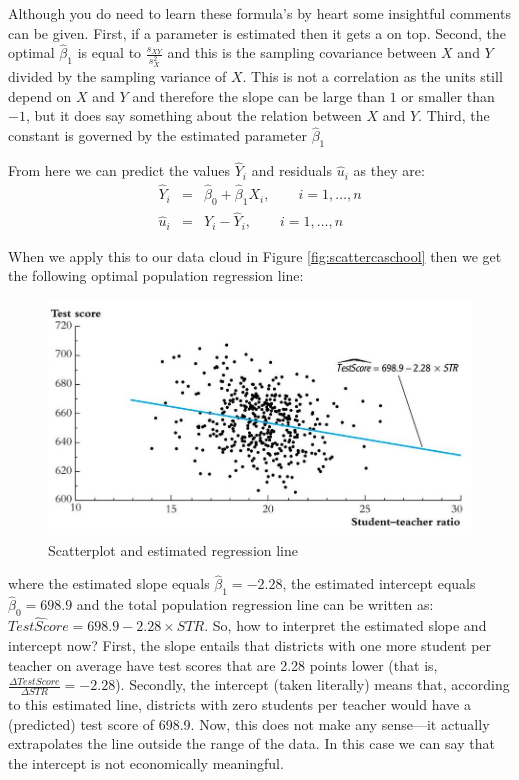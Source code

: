 \documentclass[
]{book}
\begin{document}
Although you do need to learn these formula's by heart some insightful comments can be given. First, if a parameter is estimated then it gets a on top. Second, the optimal \(\hat{\beta}_1\) is equal to \(\frac{s_{XY}}{s^2_X}\) and this is the sampling covariance between \(X\) and \(Y\) divided by the sampling variance of \(X\). This is not a correlation as the units still depend on \(X\) and \(Y\) and therefore the slope can be large than \(1\) or smaller than \(-1\), but it does say something about the relation between \(X\) and \(Y\). Third, the constant is governed by the estimated parameter \(\hat{\beta}_1\)

From here we can predict the values \(\hat{Y}_i\) and residuals \(\hat{u}_i\) as they are:
\begin{eqnarray}
    \hat{Y}_i &=& \hat{\beta}_0 + \hat{\beta}_1 X_i, \qquad i = 1, \ldots, n\\
    \hat{u}_i &=& Y_i - \hat{Y}_i, \qquad i = 1, \ldots, n
\end{eqnarray}

When we apply this to our data cloud in Figure \ref{fig:scattercaschool} then we get the following optimal population regression line:

\begin{figure}

{\centering \includegraphics[width=600px]{./figures/Lecture1_sheet13} 

}

\caption{Scatterplot and estimated regression line}\label{fig:cloud}
\end{figure}

where the estimated slope equals \(\hat{\beta}_1 = -2.28\), the estimated intercept equals \(\hat{\beta}_0 = 698.9\) and the total population regression line can be written as: \(\widehat{TestScore} = 698.9 - 2.28 \times STR\). So, how to interpret the estimated slope and intercept now? First, the slope entails that districts with one more student per teacher on average have test scores that are 2.28 points lower (that is, \(\frac{\Delta TestScore}{\Delta STR} =-2.28\)). Secondly, the intercept (taken literally) means that, according to this estimated line, districts with zero students per teacher would have a (predicted) test score of 698.9. Now, this does not make any sense---it actually extrapolates the line outside the range of the data. In this case we can say that the intercept is not economically meaningful.
\end{document}
